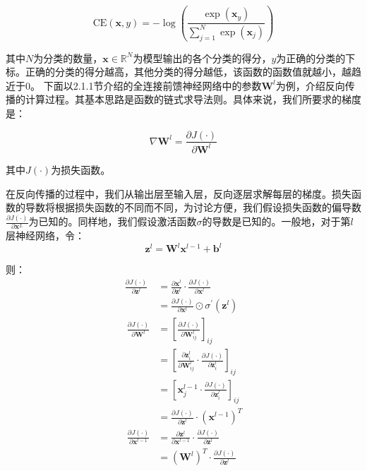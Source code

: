 \begin{equation}
    \mathrm{CE}\left(\bm{x},y\right)=-\log{\left(\frac{\exp{\left(\bm{x}_y\right)}}{\sum_{j=1}^{N}\exp{\left(\bm{x}_j\right)}}\right)}
\end{equation}

其中$N$为分类的数量，$\bm{x}\in\mathbb{R}^N$为模型输出的各个分类的得分，$y$为正确的分类的下标。正确的分类的得分越高，其他分类的得分越低，该函数的函数值就越小，越趋近于0。
下面以2.1.1节介绍的全连接前馈神经网络中的参数$\bm{W}^l$为例，介绍反向传播的计算过程。其基本思路是函数的链式求导法则。具体来说，我们所要求的梯度是：

\begin{equation}
    \nabla\bm{W}^l=\frac{\partial J\left(\cdot\right)}{\partial\bm{W}^l}
\end{equation}

其中$J\left(\cdot\right)$为损失函数。

在反向传播的过程中，我们从输出层至输入层，反向逐层求解每层的梯度。损失函数的导数将根据损失函数的不同而不同，为讨论方便，我们假设损失函数的偏导数$\frac{\partial J\left(\cdot\right)}{\partial\bm{x}^L}$为已知的。同样地，我们假设激活函数$\sigma$的导数是已知的。一般地，对于第$l$层神经网络，令：
\begin{equation}
    \bm{z}^l=\bm{W}^l\bm{x}^{l-1}+\bm{b}^l
\end{equation}

则：
\begin{align}
    \frac{\partial J\left(\cdot\right)}{\partial\bm{z}^l}&=\frac{\partial\bm{x}^l}{\partial\bm{z}^l}\cdot\frac{\partial J\left(\cdot\right)}{\partial\bm{x}^l}\\
    &=\frac{\partial J\left(\cdot\right)}{\partial\bm{x}^l}\odot\sigma^\prime\left(\bm{z}^l\right)\\
\
    \frac{\partial J\left(\cdot\right)}{\partial\bm{W}^l}&=\left[\frac{\partial J\left(\cdot\right)}{\partial\bm{W}_{ij}^l}\right]_{ij}\\
    &=\left[\frac{\partial\bm{z}_i^l}{\partial\bm{W}_{ij}^l}\cdot\frac{\partial J\left(\cdot\right)}{\partial\bm{z}_i^l}\right]_{ij}\\
    &=\left[\bm{x}_j^{l-1}\cdot\frac{\partial J\left(\cdot\right)}{\partial\bm{z}_i^l}\right]_{ij}\\
    &=\frac{\partial J\left(\cdot\right)}{\partial\bm{z}^l}\cdot\left(\bm{x}^{l-1}\right)^T\\
\
    \frac{\partial J\left(\cdot\right)}{\partial\bm{x}^{l-1}}&=\frac{\partial\bm{z}^l}{\partial\bm{x}^{l-1}}\cdot\frac{\partial J\left(\cdot\right)}{\partial\bm{z}^l}\\
    &=\left(\bm{W}^l\right)^T\cdot\frac{\partial J\left(\cdot\right)}{\partial\bm{z}^l}
\end{align}

